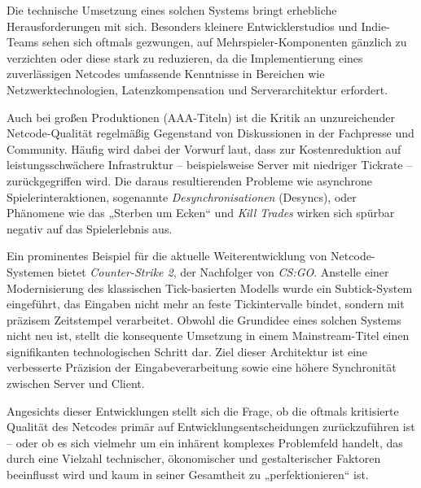 Die technische Umsetzung eines solchen Systems bringt erhebliche Herausforderungen mit sich. Besonders kleinere Entwicklerstudios und Indie-Teams sehen sich oftmals gezwungen, auf Mehrspieler-Komponenten gänzlich zu verzichten oder diese stark zu reduzieren, da die Implementierung eines zuverlässigen Netcodes umfassende Kenntnisse in Bereichen wie Netzwerktechnologien, Latenzkompensation und Serverarchitektur erfordert.

Auch bei großen Produktionen (AAA-Titeln) ist die Kritik an unzureichender Netcode-Qualität regelmäßig Gegenstand von Diskussionen in der Fachpresse und Community. Häufig wird dabei der Vorwurf laut, dass zur Kostenreduktion auf leistungsschwächere Infrastruktur – beispielsweise Server mit niedriger Tickrate – zurückgegriffen wird. Die daraus resultierenden Probleme wie asynchrone Spielerinteraktionen, sogenannte \emph{Desynchronisationen} (Desyncs), oder Phänomene wie das „Sterben um Ecken“ und \emph{Kill Trades} wirken sich spürbar negativ auf das Spielerlebnis aus.

Ein prominentes Beispiel für die aktuelle Weiterentwicklung von Netcode-Systemen bietet \emph{Counter-Strike 2}, der Nachfolger von \emph{CS:GO}. Anstelle einer Modernisierung des klassischen Tick-basierten Modells wurde ein Subtick-System eingeführt, das Eingaben nicht mehr an feste Tickintervalle bindet, sondern mit präzisem Zeitstempel verarbeitet. Obwohl die Grundidee eines solchen Systems nicht neu ist, stellt die konsequente Umsetzung in einem Mainstream-Titel einen signifikanten technologischen Schritt dar. Ziel dieser Architektur ist eine verbesserte Präzision der Eingabeverarbeitung sowie eine höhere Synchronität zwischen Server und Client.

Angesichts dieser Entwicklungen stellt sich die Frage, ob die oftmals kritisierte Qualität des Netcodes primär auf Entwicklungsentscheidungen zurückzuführen ist – oder ob es sich vielmehr um ein inhärent komplexes Problemfeld handelt, das durch eine Vielzahl technischer, ökonomischer und gestalterischer Faktoren beeinflusst wird und kaum in seiner Gesamtheit zu „perfektionieren“ ist.

